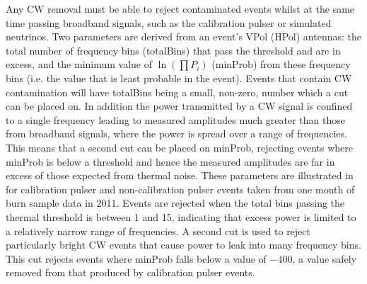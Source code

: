 Any CW removal must be able to reject contaminated events whilst at the same time passing broadband signals, such as the calibration pulser or simulated neutrinos. Two parameters are derived from an event's VPol (HPol) antennas: the total number of frequency bins (totalBins) that pass the threshold and are in excess, and the minimum value of $\ln(\prod P_{i})$ (minProb) from these frequency bins (i.e. the value that is least probable in the event). Events that contain CW contamination will have totalBins being a small, non-zero, number which a cut can be placed on. In addition the power transmitted by a CW signal is confined to a single frequency leading to measured amplitudes much greater than those from broadband signals, where the power is spread over a range of frequencies. This means that a second cut can be placed on minProb, rejecting events where minProb is below a threshold and hence the measured amplitudes are far in excess of those expected from thermal noise. These parameters are illustrated in  for calibration pulser and non-calibration pulser events taken from one month of burn sample data in 2011. Events are rejected when the total bins passing the thermal threshold is between 1 and 15, indicating that excess power is limited to a relatively narrow range of frequencies. A second cut is used to reject particularly bright CW events that cause power to leak into many frequency bins. This cut rejects events where minProb falls below a value of $-400$, a value safely removed from that produced by calibration pulser events. 


